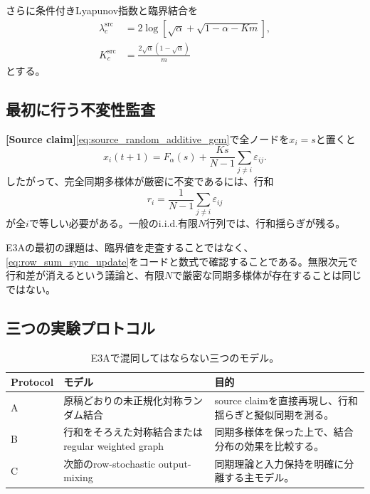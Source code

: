 \documentclass[a4paper,11pt,oneside,openany]{ltjsbook}
\newcommand{\SourceClaim}{\textcolor{Brick}{\sffamily\bfseries [Source claim]}}
\begin{document}
さらに条件付きLyapunov指数と臨界結合を
\begin{align}
  \lambda_c^{\mathrm{src}}
  &=2\log\left[
    \sqrt\alpha+\sqrt{1-\alpha-Km}
  \right],
  \label{eq:source_conditional_lyap}\\
  K_c^{\mathrm{src}}
  &=\frac{2\sqrt\alpha(1-\sqrt\alpha)}{m}
  \label{eq:source_kc}
\end{align}
とする。

\subsection{最初に行う不変性監査}

\SourceClaim \cref{eq:source_random_additive_gcm}で全ノードを\(x_i=s\)と置くと
\begin{equation}
  x_i(t+1)
  =F_\alpha(s)
   +\frac{Ks}{N-1}\sum_{j\ne i}\varepsilon_{ij}.
  \label{eq:row_sum_sync_update}
\end{equation}
したがって、完全同期多様体が厳密に不変であるには、行和
\begin{equation}
  r_i=\frac1{N-1}\sum_{j\ne i}\varepsilon_{ij}
  \label{eq:row_mean}
\end{equation}
が全\(i\)で等しい必要がある。一般のi.i.d.有限\(N\)行列では、行和揺らぎが残る。

\begin{auditbox}
E3Aの最初の課題は、臨界値を走査することではなく、\cref{eq:row_sum_sync_update}をコードと数式で確認することである。無限次元で行和差が消えるという議論と、有限\(N\)で厳密な同期多様体が存在することは同じではない。
\end{auditbox}

\subsection{三つの実験プロトコル}

\begin{table}[htbp]
\centering
\caption{E3Aで混同してはならない三つのモデル。}
\label{tab:e3a_protocols}
\begin{tabularx}{\textwidth}{p{24mm}p{45mm}X}
\toprule
Protocol & モデル & 目的 \\
\midrule
A & 原稿どおりの未正規化対称ランダム結合 & source claimを直接再現し、行和揺らぎと擬似同期を測る。\\
B & 行和をそろえた対称結合またはregular weighted graph & 同期多様体を保った上で、結合分布の効果を比較する。\\
C & 次節のrow-stochastic output-mixing & 同期理論と入力保持を明確に分離する主モデル。\\
\bottomrule
\end{tabularx}
\end{table}
\end{document}
